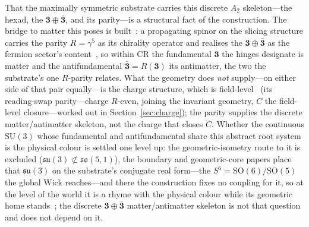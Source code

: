 \documentclass[11pt,a4paper]{article}
\theoremstyle{definition}
\begin{document}
That the maximally symmetric substrate carries this discrete $A_{2}$ skeleton---the hexad, the $\mathbf 3\oplus\bar{\mathbf 3}$, and its parity---is a structural fact of the construction. The bridge to matter this poses is built~\cite{JanzenMatter}: a propagating spinor on the slicing structure carries the parity $R=\gamma^5$ as its chirality operator and realises the $\mathbf 3\oplus\bar{\mathbf 3}$ as the fermion sector's content~\cite{JanzenMatter}, so within CR the fundamental $\mathbf 3$ the hinges designate is matter and the antifundamental $\bar{\mathbf 3}=R(\mathbf 3)$ its antimatter, the two the substrate's one $R$-parity relates. What the geometry does \emph{not} supply---on either side of that pair equally---is the charge structure, which is field-level~\cite{JanzenBoundary} (its reading-swap parity---charge $R$-even, joining the invariant geometry, $C$ the field-level closure---worked out in Section~\ref{sec:charge}); the parity supplies the discrete matter/antimatter skeleton, not the charge that closes $C$. Whether the continuous $\mathrm{SU}(3)$ whose fundamental and antifundamental share this abstract root system is the physical colour is settled one level up: the geometric-isometry route to it is excluded ($\mathfrak{su}(3)\not\subset\mathfrak{so}(5,1)$), the boundary and geometric-core papers place that $\mathfrak{su}(3)$ on the substrate's conjugate real form---the $S^{5}=\mathrm{SO}(6)/\mathrm{SO}(5)$ the global Wick reaches---and there the construction fixes no coupling for it, so at the level of the world it is a rhyme with the physical colour while its geometric home stands~\cite{JanzenBoundary,JanzenGeometricCore}; the discrete $\mathbf 3\oplus\bar{\mathbf 3}$ matter/antimatter skeleton is not that question and does not depend on it.
\end{document}
